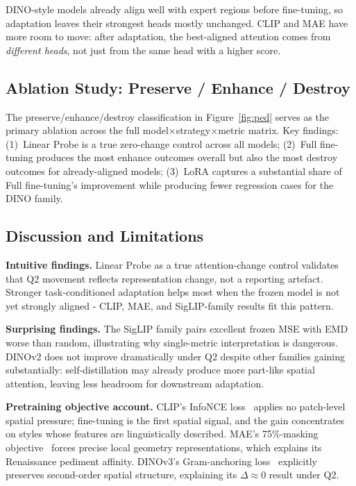 \documentclass{article}
\begin{document}
DINO-style models already align well with expert regions before fine-tuning,
so adaptation leaves their strongest heads mostly unchanged. CLIP and MAE
have more room to move: after adaptation, the best-aligned attention comes
from \emph{different heads}, not just from the same head with a higher score.

\subsection{Ablation Study: Preserve / Enhance / Destroy}

The preserve/enhance/destroy classification in Figure~\ref{fig:ped} serves as
the primary ablation across the full model$\times$strategy$\times$metric matrix.
Key findings: (1)~Linear Probe is a true zero-change control across all models;
(2)~Full fine-tuning produces the most enhance outcomes overall but also the most
destroy outcomes for already-aligned models; (3)~LoRA captures a substantial
share of Full fine-tuning's improvement while producing fewer regression cases
for the DINO family.

\subsection{Discussion and Limitations}

\textbf{Intuitive findings.} Linear Probe as a true attention-change control
validates that Q2 movement reflects representation change, not a reporting
artefact. Stronger task-conditioned adaptation helps most when the frozen model
is not yet strongly aligned - CLIP, MAE, and SigLIP-family results fit this
pattern.

\textbf{Surprising findings.} The SigLIP family pairs excellent frozen MSE with
EMD worse than random, illustrating why single-metric interpretation is
dangerous. DINOv2 does not improve dramatically under Q2 despite other families
gaining substantially: self-distillation may already produce more part-like
spatial attention, leaving less headroom for downstream adaptation.

\textbf{Pretraining objective account.} CLIP's InfoNCE loss~\cite{Radford21CLIP}
applies no patch-level spatial pressure; fine-tuning is the first spatial signal,
and the gain concentrates on styles whose features are linguistically described.
MAE's 75\%-masking objective~\cite{He22MAE} forces precise local geometry
representations, which explains its Renaissance pediment affinity. DINOv3's
Gram-anchoring loss~\cite{Simeoni25DINOv3} explicitly preserves second-order
spatial structure, explaining its $\Delta\!\approx\!0$ result under Q2.
\end{document}
